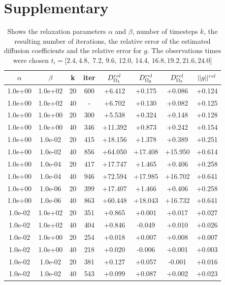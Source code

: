 \documentclass[11pt,a4paper]{article}
\begin{document}
\section{Supplementary}
\begin{table}
\centering
\caption{ Shows the relaxation parameters $\alpha$ and $\beta$, number of timesteps $k$, the resulting number of iterations, the relative error of the estimated diffusion coefficients and the relative error for $g$. The observations times were chosen $ t_i=[2.4, 4.8,$ 7.2, 9.6, 12.0, 14.4, $16.8, 19.2, 21.6, 24.0]$ }
\begin{tabular}{*{8}c}
$\alpha$ & $\beta$ & k & iter & $ D_{\Omega_1}\sp{rel}$& $D_{\Omega_2}\sp{rel} $ & $D_{\Omega_3}\sp{rel} $&$|| g ||\sp{rel} $ \\
\hline
 1.0e+00 	 & 1.0e+02 	 & 20 & 600 	 & +6.412 & +0.175 & +0.086 & +0.124 \\
 1.0e+00 	 & 1.0e+02 	 & 40 &  -   & +6.702 & +0.130 & +0.082 & +0.125 \\  
 1.0e+00 	 & 1.0e+00 	 & 20 & 300 	 & +5.538 & +0.324 & +0.148 & +0.128 \\ 
 1.0e+00 	 & 1.0e+00 	 & 40 & 346 	 & +11.392 & +0.873 & +0.242 & +0.154 \\ 
 1.0e+00 	 & 1.0e-02 	 & 20 & 415 	 & +18.156 & +1.378  & +0.389  & +0.251 \\ 
 1.0e+00 	 & 1.0e-02 	 & 40 & 856 	 & +64.050 & +17.408 & +15.950 & +0.614 \\ 
 1.0e+00 	 & 1.0e-04 	 & 20 & 417 	 & +17.747 & +1.465  & +0.406  & +0.258 \\ 
 1.0e+00 	 & 1.0e-04 	 & 40 & 946 	 & +72.594 & +17.985 & +16.702 & +0.641 \\
 1.0e+00 	 & 1.0e-06 	 & 20 & 399 	 & +17.407 & +1.466  & +0.406  & +0.258 \\ 
 1.0e+00 	 & 1.0e-06 	 & 40 & 863 	 & +60.448 & +18.043 & +16.732 & +0.641 \\
 \hline
 1.0e-02 	 & 1.0e+02 	 & 20 & 351 	 & +0.865 & +0.001 & +0.017 & +0.027 \\ 
 1.0e-02 	 & 1.0e+02 	 & 40 & 404 	 & +0.846 & -0.049 & +0.010 & +0.026 \\ 
 1.0e-02 	 & 1.0e+00 	 & 20 & 254 	 & +0.018 & +0.007 & +0.008 & +0.007 \\ 
 1.0e-02 	 & 1.0e+00 	 & 40 & 218 	 & +0.020 & -0.006 & +0.001 & +0.003 \\ 
 1.0e-02 	 & 1.0e-02 	 & 20 & 381 	 & +0.127 & +0.057 & -0.001 & +0.016 \\ 
 1.0e-02 	 & 1.0e-02 	 & 40 & 543 	 & +0.099 & +0.087 & +0.002 & +0.023 \\

\end{tabular}
\end{table}
\end{document}
